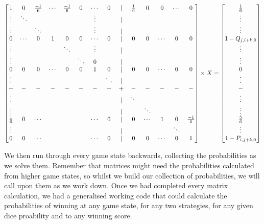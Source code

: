 \documentclass[a4paper,titlepage]{article}
\begin{document}
\begin{align*}
	\setcounter{MaxMatrixCols}{40}
	\begin{bmatrix}
		1&0&\frac{-1}{6}&\cdots&\frac{-1}{6}&0&\cdots&0&|&\frac{1}{6}&0&0&\cdots&0\\
		\vdots& \ddots &&&&&\vdots&&			|&&&&&\\
		\vdots&& \ddots &&&&\vdots&&			|&&&&&\\
		0 & \cdots & 0 & 1 & 0 & 0 &\cdots&0&   |&0&0&\cdots&0&0\\
		\vdots&&&&\ddots&&\vdots&&				|&&&&&\\
		\vdots&&&&&\ddots&0&&					|&&&&&\\
		0&0&0&\cdots&0&0&1&0&					|&0&0&\cdots&0&0\\
		\vdots&&&&&&&\ddots&					|&&&&&\\
		-&-&-&-&-&-&-&-&    					+&-&-&-&-&-\\
		\vdots& & & & & & & &    				|&\ddots& & & &\\
		\vdots& & & & & & & &    				|&&\ddots&&&\\
		\frac{1}{6}&0&\cdots&&&&\cdots&0&		|&0&\cdots& 1 & 0 & \frac{-1}{6}\\
		\vdots& & & & & & & &    				|&&&&\ddots\\
		0&0&\cdots& & & &\cdots&0&   			|&0&0&\cdots&0&1\\
	\end{bmatrix}
	\times X =
	\begin{bmatrix}
		\frac{1}{6}\\
		\vdots\\
		\vdots\\
		1-Q_{j,i+k,0}\\
		\vdots\\
		\vdots\\
		0\\
		\vdots\\
		-\\
		\vdots\\
		\vdots\\
		\frac{5}{6}\\
		\vdots\\
		1-P_{i,j+k,0}\\
	\end{bmatrix}
\end{align*}

We then run through every game state backwards, collecting the probabilities as we solve them. Remember that matrices might need the probabilities calculated from higher game states, so whilst we build our collection of probabilities, we will call upon them as we work down. Once we had completed every matrix calculation, we had a generalised working code that could calculate the probabilities of winning at any game state, for any two strategies, for any given dice proability and to any winning score.
\end{document}
